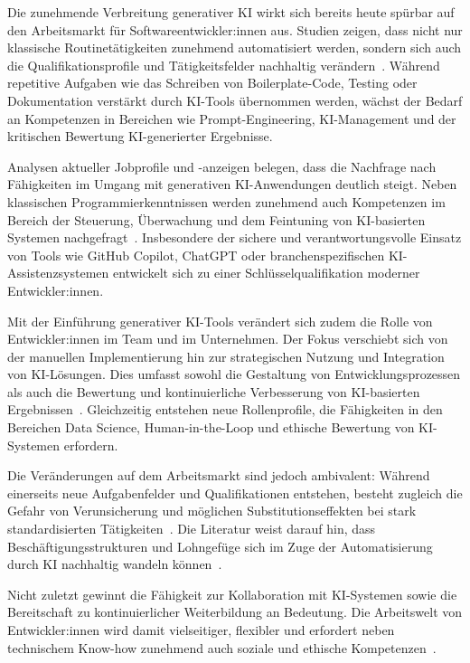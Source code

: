 
Die zunehmende Verbreitung generativer KI wirkt sich bereits heute spürbar auf
den Arbeitsmarkt für Softwareentwickler:innen aus. Studien zeigen, dass nicht
nur klassische Routinetätigkeiten zunehmend automatisiert werden, sondern sich
auch die Qualifikationsprofile und Tätigkeitsfelder nachhaltig
verändern~\cite{siebert_generative_2024,braun_ki_2024,s_future_2024}. Während
repetitive Aufgaben wie das Schreiben von Boilerplate-Code, Testing oder
Dokumentation verstärkt durch KI-Tools übernommen werden, wächst der Bedarf an
Kompetenzen in Bereichen wie Prompt-Engineering, KI-Management und der
kritischen Bewertung KI-generierter Ergebnisse.

Analysen aktueller Jobprofile und -anzeigen belegen, dass die Nachfrage nach
Fähigkeiten im Umgang mit generativen KI-Anwendungen deutlich steigt. Neben
klassischen Programmierkenntnissen werden zunehmend auch Kompetenzen im Bereich
der Steuerung, Überwachung und dem Feintuning von KI-basierten Systemen
nachgefragt~\cite{ahmadi_generative_2024}. Insbesondere der sichere und
verantwortungsvolle Einsatz von Tools wie GitHub Copilot, ChatGPT oder
branchenspezifischen KI-Assistenzsystemen entwickelt sich zu einer
Schlüsselqualifikation moderner Entwickler:innen.

Mit der Einführung generativer KI-Tools verändert sich zudem die Rolle von
Entwickler:innen im Team und im Unternehmen. Der Fokus verschiebt sich von der
manuellen Implementierung hin zur strategischen Nutzung und Integration von
KI-Lösungen. Dies umfasst sowohl die Gestaltung von Entwicklungsprozessen als
auch die Bewertung und kontinuierliche Verbesserung von KI-basierten
Ergebnissen~\cite{storey_generative_2025}. Gleichzeitig entstehen neue
Rollenprofile, die Fähigkeiten in den Bereichen Data Science, Human-in-the-Loop
und ethische Bewertung von KI-Systemen erfordern.

Die Veränderungen auf dem Arbeitsmarkt sind jedoch ambivalent: Während
einerseits neue Aufgabenfelder und Qualifikationen entstehen, besteht zugleich
die Gefahr von Verunsicherung und möglichen Substitutionseffekten bei stark
standardisierten Tätigkeiten~\cite{farach_evolving_2025}. Die Literatur weist
darauf hin, dass Beschäftigungsstrukturen und Lohngefüge sich im Zuge der
Automatisierung durch KI nachhaltig wandeln
können~\cite{marguerit_augmenting_2025}.

Nicht zuletzt gewinnt die Fähigkeit zur Kollaboration mit KI-Systemen sowie die
Bereitschaft zu kontinuierlicher Weiterbildung an Bedeutung. Die Arbeitswelt
von Entwickler:innen wird damit vielseitiger, flexibler und erfordert neben
technischem Know-how zunehmend auch soziale und ethische
Kompetenzen~\cite{storey_generative_2025,siebert_generative_2024}.

